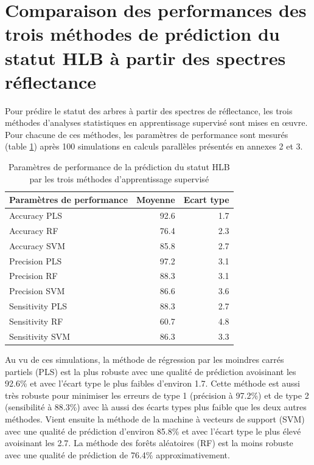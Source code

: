 \documentclass[
  11pt,
  french,
  a4paper,
  extrafontsizes,onecolumn,openright
  ]{memoir}
\begin{document}
\vfill
\newpage

\hypertarget{comparaison-des-performances-des-trois-muxe9thodes-de-pruxe9diction-du-statut-hlb-uxe0-partir-des-spectres-ruxe9flectance}{%
\section{Comparaison des performances des trois méthodes de prédiction du statut HLB à partir des spectres réflectance}\label{comparaison-des-performances-des-trois-muxe9thodes-de-pruxe9diction-du-statut-hlb-uxe0-partir-des-spectres-ruxe9flectance}}

Pour prédire le statut des arbres à partir des spectres de réflectance, les trois méthodes d'analyses statistiques en apprentissage supervisé sont mises en œuvre. Pour chacune de ces méthodes, les paramètres de performance sont mesurés (table \ref{tab:T2}) après 100 simulations en calculs parallèles présentés en annexes 2 et 3.

\scriptsize

\begin{longtable}[t]{lrr}
\caption{\label{tab:T2}Paramètres de performance de la prédiction du statut HLB par les trois méthodes d'apprentissage supervisé}\\
\toprule
Paramètres de performance & Moyenne & Ecart type\\
\midrule
Accuracy PLS & 92.6 & 1.7\\
Accuracy RF & 76.4 & 2.3\\
Accuracy SVM & 85.8 & 2.7\\
Precision PLS & 97.2 & 3.1\\
Precision RF & 88.3 & 3.1\\
\addlinespace
Precision SVM & 86.6 & 3.6\\
Sensitivity PLS & 88.3 & 2.7\\
Sensitivity RF & 60.7 & 4.8\\
Sensitivity SVM & 86.3 & 3.3\\
\bottomrule
\end{longtable}

\normalsize

Au vu de ces simulations, la méthode de régression par les moindres carrés partiels (PLS) est la plus robuste avec une qualité de prédiction avoisinant les 92.6\% et avec l'écart type le plus faibles d'environ 1.7.
Cette méthode est aussi très robuste pour minimiser les erreurs de type 1 (précision à 97.2\%) et de type 2 (sensibilité à 88.3\%) avec là aussi des écarts types plus faible que les deux autres méthodes.
Vient ensuite la méthode de la machine à vecteurs de support (SVM) avec une qualité de prédiction d'environ 85.8\% et avec l'écart type le plus élevé avoisinant les 2.7. La méthode des forêts aléatoires (RF) est la moins robuste avec une qualité de prédiction de 76.4\% approximativement.
\end{document}
